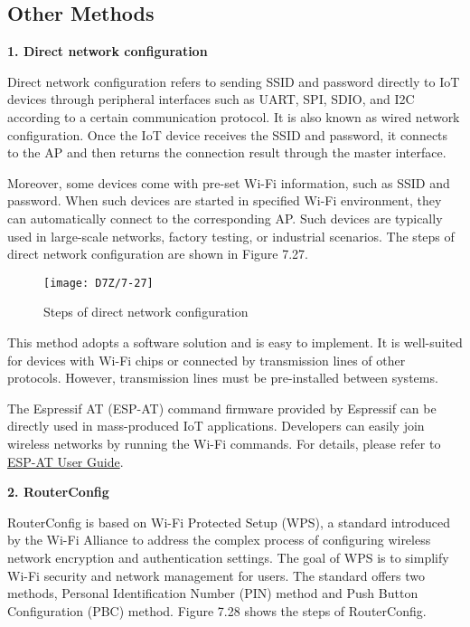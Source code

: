 \documentclass[a4paper,12pt]{book}
\begin{document}

\subsection{Other Methods}
\textbf{1. Direct network configuration}

Direct network configuration refers to sending SSID and password directly to IoT devices through peripheral interfaces such as UART, SPI, SDIO, and I2C according to a certain communication protocol. It is also known as wired network configuration. Once the IoT device receives the SSID and password, it connects to the AP and then returns the connection result through the master interface.

Moreover, some devices come with pre-set Wi-Fi information, such as SSID and password. When such devices are started in specified Wi-Fi environment, they can automatically connect to the corresponding AP. Such devices are typically used in large-scale networks, factory testing, or industrial scenarios. The steps of direct network configuration are shown in Figure 7.27.

\begin{figure}[!h]
    \centering
    \texttt{[image: D7Z/7-27]}
    \caption{Steps of direct network configuration}
\end{figure}

This method adopts a software solution and is easy to implement. It is well-suited for devices with Wi-Fi chips or connected by transmission lines of other protocols. However, transmission lines must be pre-installed between systems.

The Espressif AT (ESP-AT) command firmware provided by Espressif can be directly used in mass-produced IoT applications. Developers can easily join wireless networks by running the Wi-Fi commands. For details, please refer to \href{https://docs.espressif.com/projects/esp-at/en/latest/esp32/index.html}{ESP-AT User Guide}.

\textbf{2. RouterConfig}

RouterConfig is based on Wi-Fi Protected Setup (WPS), a standard introduced by the Wi-Fi Alliance to address the complex process of configuring wireless network encryption and authentication settings. The goal of WPS is to simplify Wi-Fi security and network management for users. The standard offers two methods, Personal Identification Number (PIN) method and Push Button Configuration (PBC) method. Figure 7.28 shows the steps of RouterConfig.
\end{document}
